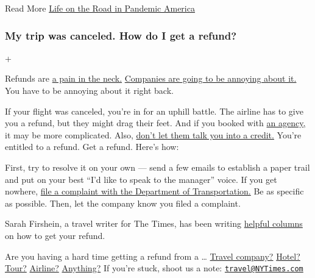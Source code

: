 Read More
\href{https://www.nytimes3xbfgragh.onion/2020/06/14/business/coronavirus-road-trip.html}{Life
on the Road in Pandemic America}

\hypertarget{my-trip-was-canceled-how-do-i-get-a-refund}{%
\subsubsection{My trip was canceled. How do I get a
refund?}\label{my-trip-was-canceled-how-do-i-get-a-refund}}

+

Refunds are
\href{https://www.nytimes3xbfgragh.onion/2020/04/18/your-money/coronavirus-refunds.html}{a
pain in the neck.}
\href{https://www.nytimes3xbfgragh.onion/2020/06/12/travel/virus-airlines-private-arbitration.html}{Companies
are going to be annoying about it.} You have to be annoying about it
right back.

If your flight was canceled, you're in for an uphill battle. The airline
has to give you a refund, but they might drag their feet. And if you
booked with
\href{https://www.nytimes3xbfgragh.onion/2020/04/03/travel/coronavirus-refund-travel-ota.html}{an
agency,} it may be more complicated. Also,
\href{https://www.nytimes3xbfgragh.onion/2020/05/12/travel/refunds-or-credits-travelers-and-businesses-face-off.html}{don't
let them talk you into a credit.} You're entitled to a refund. Get a
refund. Here's how:

First, try to resolve it on your own --- send a few emails to establish
a paper trail and put on your best ``I'd like to speak to the manager''
voice. If you get nowhere,
\href{https://airconsumer.dot.gov/escomplaint/ConsumerForm.cfm}{file a
complaint with the Department of Transportation.} Be as specific as
possible. Then, let the company know you filed a complaint.

Sarah Firshein, a travel writer for The Times, has been writing
\href{https://www.nytimes3xbfgragh.onion/2019/09/15/reader-center/travel-sarah-firshein-tripped-up-columnist.html}{helpful
columns} on how to get your refund.

Are you having a hard time getting a refund from a \ldots{}
\href{https://www.nytimes3xbfgragh.onion/2020/05/25/travel/coronavirus-refunds-overseas-adventure-travel.html}{Travel
company?}
\href{https://www.nytimes3xbfgragh.onion/2020/07/07/travel/virus-refunds-hotel-franchises.html}{Hotel?}
\href{https://www.nytimes3xbfgragh.onion/2020/04/11/travel/coronavirus-travel-trip-refunds.html}{Tour?}
\href{https://www.nytimes3xbfgragh.onion/2020/05/01/travel/trip-refund-airlines.html}{Airline?}
\href{https://www.nytimes3xbfgragh.onion/2020/06/18/travel/travel-refunds-airlines.html}{Anything?}
If you're stuck, shoot us a note:
\href{mailto:travel@NYTimes.com}{\nolinkurl{travel@NYTimes.com}}

